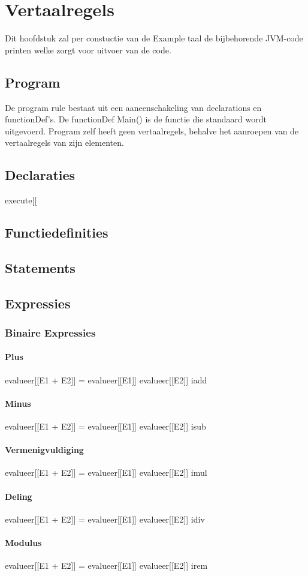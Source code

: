 \chapter{Vertaalregels}
Dit hoofdstuk zal per constuctie van de Example taal de bijbehorende JVM-code printen welke zorgt voor uitvoer van de code.

\section{Program}
De program rule bestaat uit een aaneenschakeling van declarations en functionDef's. De functionDef Main() is de functie die standaard wordt uitgevoerd. Program zelf heeft geen vertaalregels, behalve het aanroepen van de vertaalregels van zijn elementen. 

\section{Declaraties}
execute[[
\section{Functiedefinities}
\section{Statements}
\section{Expressies}
    \subsection{Binaire Expressies}
        \subsubsection{Plus}
        evalueer[[E1 + E2]] =
        evalueer[[E1]]
        evalueer[[E2]]
        iadd
        \subsubsection{Minus}
        evalueer[[E1 + E2]] =
        evalueer[[E1]]
        evalueer[[E2]]
        isub
        \subsubsection{Vermenigvuldiging}
        evalueer[[E1 + E2]] =
        evalueer[[E1]]
        evalueer[[E2]]
        imul
        \subsubsection{Deling}
        evalueer[[E1 + E2]] =
        evalueer[[E1]]
        evalueer[[E2]]
        idiv
        \subsubsection{Modulus}
        evalueer[[E1 + E2]] =
        evalueer[[E1]]
        evalueer[[E2]]
        irem
